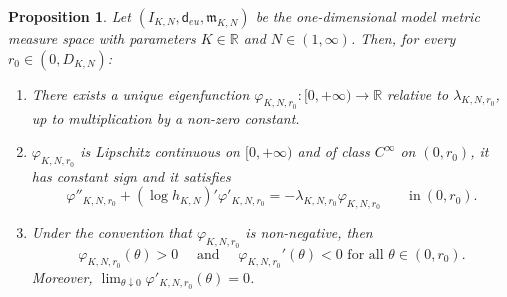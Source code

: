 \documentclass[12pt]{article}
\newcommand{\mm}{\mathfrak m}
\newcommand{\di}{\mathsf{d}}
\theoremstyle{plain}
\newtheorem{proposition}[lemma]{Proposition}
\theoremstyle{definition}
\begin{document}
\begin{proposition}\label{prop: modeleigen}
Let $(I_{K,N},\di_{eu},\mm_{K,N})$ be the one-dimensional model metric measure space with parameters $K\in \mathbb{R}$ and $N\in(1,\infty)$. Then, for every $r_0\in (0, D_{K,N})$:
\begin{enumerate}
\item There exists a unique eigenfunction $\varphi_{K,N,r_0}:[0,+\infty)\to \mathbb{R}$ relative to $\lambda_{K,N,r_0}$, up to multiplication by a non-zero constant. 
\item $\varphi_{K,N,r_0}$ is Lipschitz continuous on $[0,+\infty)$ and of class $C^\infty$ on $(0,r_0)$, it has constant sign and it satisfies
\begin{equation}\label{eq: eigen ode}
 \varphi''_{K,N,r_0}+(\log{h_{K,N}})' \varphi'_{K,N,r_0}=-\lambda_{K,N,r_0}\varphi_{K,N,r_0} \qquad \textrm{in} \ (0,r_0).
\end{equation}
\item Under the convention that $\varphi_{K,N,r_0}$ is non-negative, then 
\begin{equation}\label{eq: eigen-Decreas}
\varphi_{K,N,r_0}(\theta)>0 \quad \textrm{ and } \quad \varphi_{K,N,r_0}'(\theta)< 0 \textrm{ for all } \theta\in (0,r_0).
\end{equation}
Moreover, $\displaystyle\lim_{\theta\downarrow 0} \varphi'_{K,N,r_0}(\theta)=0$. 

\end{enumerate}
\end{proposition}
\end{document}
